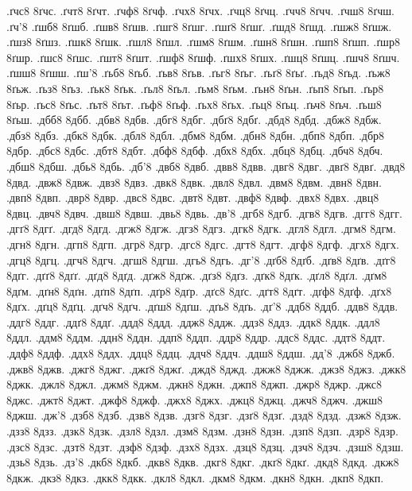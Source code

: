 {.ґчс8
8ґчс.
.ґчт8
8ґчт.
.ґчф8
8ґчф.
.ґчх8
8ґчх.
.ґчц8
8ґчц.
.ґчч8
8ґчч.
.ґчш8
8ґчш.
.ґч'8
.ґшб8
8ґшб.
.ґшв8
8ґшв.
.ґшг8
8ґшг.
.ґшґ8
8ґшґ.
.ґшд8
8ґшд.
.ґшж8
8ґшж.
.ґшз8
8ґшз.
.ґшк8
8ґшк.
.ґшл8
8ґшл.
.ґшм8
8ґшм.
.ґшн8
8ґшн.
.ґшп8
8ґшп.
.ґшр8
8ґшр.
.ґшс8
8ґшс.
.ґшт8
8ґшт.
.ґшф8
8ґшф.
.ґшх8
8ґшх.
.ґшц8
8ґшц.
.ґшч8
8ґшч.
.ґшш8
8ґшш.
.ґш'8
.ґьб8
8ґьб.
.ґьв8
8ґьв.
.ґьг8
8ґьг.
.ґьґ8
8ґьґ.
.ґьд8
8ґьд.
.ґьж8
8ґьж.
.ґьз8
8ґьз.
.ґьк8
8ґьк.
.ґьл8
8ґьл.
.ґьм8
8ґьм.
.ґьн8
8ґьн.
.ґьп8
8ґьп.
.ґьр8
8ґьр.
.ґьс8
8ґьс.
.ґьт8
8ґьт.
.ґьф8
8ґьф.
.ґьх8
8ґьх.
.ґьц8
8ґьц.
.ґьч8
8ґьч.
.ґьш8
8ґьш.
.дбб8
8дбб.
.дбв8
8дбв.
.дбг8
8дбг.
.дбґ8
8дбґ.
.дбд8
8дбд.
.дбж8
8дбж.
.дбз8
8дбз.
.дбк8
8дбк.
.дбл8
8дбл.
.дбм8
8дбм.
.дбн8
8дбн.
.дбп8
8дбп.
.дбр8
8дбр.
.дбс8
8дбс.
.дбт8
8дбт.
.дбф8
8дбф.
.дбх8
8дбх.
.дбц8
8дбц.
.дбч8
8дбч.
.дбш8
8дбш.
.дбь8
8дбь.
.дб'8
.двб8
8двб.
.двв8
8двв.
.двг8
8двг.
.двґ8
8двґ.
.двд8
8двд.
.двж8
8двж.
.двз8
8двз.
.двк8
8двк.
.двл8
8двл.
.двм8
8двм.
.двн8
8двн.
.двп8
8двп.
.двр8
8двр.
.двс8
8двс.
.двт8
8двт.
.двф8
8двф.
.двх8
8двх.
.двц8
8двц.
.двч8
8двч.
.двш8
8двш.
.двь8
8двь.
.дв'8
.дгб8
8дгб.
.дгв8
8дгв.
.дгг8
8дгг.
.дгґ8
8дгґ.
.дгд8
8дгд.
.дгж8
8дгж.
.дгз8
8дгз.
.дгк8
8дгк.
.дгл8
8дгл.
.дгм8
8дгм.
.дгн8
8дгн.
.дгп8
8дгп.
.дгр8
8дгр.
.дгс8
8дгс.
.дгт8
8дгт.
.дгф8
8дгф.
.дгх8
8дгх.
.дгц8
8дгц.
.дгч8
8дгч.
.дгш8
8дгш.
.дгь8
8дгь.
.дг'8
.дґб8
8дґб.
.дґв8
8дґв.
.дґг8
8дґг.
.дґґ8
8дґґ.
.дґд8
8дґд.
.дґж8
8дґж.
.дґз8
8дґз.
.дґк8
8дґк.
.дґл8
8дґл.
.дґм8
8дґм.
.дґн8
8дґн.
.дґп8
8дґп.
.дґр8
8дґр.
.дґс8
8дґс.
.дґт8
8дґт.
.дґф8
8дґф.
.дґх8
8дґх.
.дґц8
8дґц.
.дґч8
8дґч.
.дґш8
8дґш.
.дґь8
8дґь.
.дґ'8
.ддб8
8ддб.
.ддв8
8ддв.
.ддг8
8ддг.
.ддґ8
8ддґ.
.ддд8
8ддд.
.ддж8
8ддж.
.ддз8
8ддз.
.ддк8
8ддк.
.ддл8
8ддл.
.ддм8
8ддм.
.ддн8
8ддн.
.ддп8
8ддп.
.ддр8
8ддр.
.ддс8
8ддс.
.ддт8
8ддт.
.ддф8
8ддф.
.ддх8
8ддх.
.ддц8
8ддц.
.ддч8
8ддч.
.ддш8
8ддш.
.дд'8
.джб8
8джб.
.джв8
8джв.
.джг8
8джг.
.джґ8
8джґ.
.джд8
8джд.
.джж8
8джж.
.джз8
8джз.
.джк8
8джк.
.джл8
8джл.
.джм8
8джм.
.джн8
8джн.
.джп8
8джп.
.джр8
8джр.
.джс8
8джс.
.джт8
8джт.
.джф8
8джф.
.джх8
8джх.
.джц8
8джц.
.джч8
8джч.
.джш8
8джш.
.дж'8
.дзб8
8дзб.
.дзв8
8дзв.
.дзг8
8дзг.
.дзґ8
8дзґ.
.дзд8
8дзд.
.дзж8
8дзж.
.дзз8
8дзз.
.дзк8
8дзк.
.дзл8
8дзл.
.дзм8
8дзм.
.дзн8
8дзн.
.дзп8
8дзп.
.дзр8
8дзр.
.дзс8
8дзс.
.дзт8
8дзт.
.дзф8
8дзф.
.дзх8
8дзх.
.дзц8
8дзц.
.дзч8
8дзч.
.дзш8
8дзш.
.дзь8
8дзь.
.дз'8
.дкб8
8дкб.
.дкв8
8дкв.
.дкг8
8дкг.
.дкґ8
8дкґ.
.дкд8
8дкд.
.дкж8
8дкж.
.дкз8
8дкз.
.дкк8
8дкк.
.дкл8
8дкл.
.дкм8
8дкм.
.дкн8
8дкн.
.дкп8
8дкп.
}
